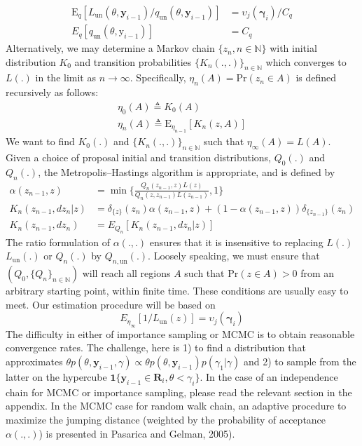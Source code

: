 \documentclass[11pt]{article}
\begin{document}
\begin{align}
\mathrm{E}_q[L_{\mathrm{un}}(\theta,\mathbf{y}_{i-1})/q_{\mathrm{un}}(\theta,\mathbf{y}_{i-1})]
&=\upsilon_j(\boldsymbol{\gamma}_i)/C_q\\
E_q[q_{\mathrm{un}}(\theta,\mathrm{y}_{i-1})]&=C_q
\end{align}Alternatively, we may determine a Markov chain $\{z_n, n\in
\mathbb{N}\}$ with initial distribution $K_0$ and transition
probabilities $\{K_n(.,.)\}_{n\in \mathbb{N}}$ which converges to
$L(.)$ in the limit as $n\rightarrow \infty$. Specifically,
$\eta_n(A)=\mathrm{Pr}(z_n\in A)$ is defined recursively as follows:
\begin{align}
\eta_0(A)\triangleq K_0(A)\\
\eta_n(A)\triangleq \mathrm{E}_{\eta_{n-1}}[K_n(z,A)]
\end{align}We want to find $K_0(.)$ and $\{K_n(.,.)\}_{n\in \mathbb{N}}$ such that
$\eta_{\infty}(A)=L(A)$. Given a choice of proposal initial and
transition distributions, $Q_0(.)$ and $Q_n(.)$, the
Metropolis--Hastings algorithm is appropriate, and is defined by
\begin{align}
\alpha(z_{n-1},z)&=\min\{\frac{Q_n(z_{n-1},z)L(z)}{Q_n(z,z_{n-1})L(z_{n-1})},1\}\\
K_n(z_{n-1},d{z_n}|z)&=\delta_{\{z\}}(z_n)\alpha(z_{n-1},z)+(1-\alpha(z_{n-1},z))\delta_{\{z_{n-1}\}}(z_n)\\
K_n(z_{n-1},d{z_n})&=E_{Q_n}[K_n(z_{n-1},d{z_n}|z)]
\end{align}The ratio formulation of $\alpha(.,.)$ ensures that it is
insensitive to replacing $L(.)$ $L_{\mathrm{un}}(.)$ or $Q_n(.)$ by
$Q_{n,\mathrm{un}}(.)$. Loosely speaking, we must ensure that
$(Q_0,\{Q_n\}_{n\in\mathbb{N}})$ will reach all regions $A$ such
that $\mathrm{Pr}(z \in A)>0$ from an arbitrary starting point,
within finite time. These conditions are usually easy to meet. Our
estimation procedure will be based on
\begin{equation}
E_{\eta_{\infty}}[1/L_{\mathrm{un}}(z)]=\upsilon_j(\boldsymbol{\gamma}_i)
\end{equation}
The difficulty in either of importance sampling or MCMC is to obtain
reasonable convergence rates. The challenge, here is 1) to find a
distribution that approximates $\theta
p(\theta,\mathbf{y}_{i-1},\gamma)\propto \theta
p(\theta,\mathbf{y}_{i-1})p(\gamma_1|\gamma)$ and 2) to sample from
the latter on the hypercube $\boldsymbol{1}\{\mathbf{y}_{i-1}\in
\mathbf{R}_i, \theta<\gamma_i\}$. In the case of an independence
chain for MCMC or importance sampling, please read the relevant
section in the appendix. In the MCMC case for random walk chain, an
adaptive procedure to maximize the jumping distance (weighted by the
probability of acceptance $\alpha(.,.)$) is presented in Pasarica
and Gelman, 2005).
\end{document}
